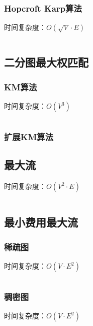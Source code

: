 \documentclass[a4paper]{article}
\newcommand{\cppcode}[1]{
    \inputminted[mathescape]{cpp}{source/#1}
}
\begin{document}
\subsubsection{Hopcroft Karp算法}

时间复杂度：$O(\sqrt{V} \cdot E)$

\cppcode{graph-theory/maximum-matching-hopcroft-karp.cpp}

\subsection{二分图最大权匹配}

\subsubsection{KM算法}

时间复杂度：$O(V^3)$

\cppcode{graph-theory/maximum-weight-matching.cpp}

\subsubsection{扩展KM算法}

\subsection{最大流}

时间复杂度：$O(V^2 \cdot E)$

\cppcode{graph-theory/maximum-flow.cpp}

\subsection{最小费用最大流}

\subsubsection{稀疏图}

时间复杂度：$O(V \cdot E^2)$

\cppcode{graph-theory/minimum-cost-flow-spfa.cpp}

\subsubsection{稠密图}

时间复杂度：$O(V \cdot E^2)$

\cppcode{graph-theory/minimum-cost-flow-zkw.cpp}
\end{document}
